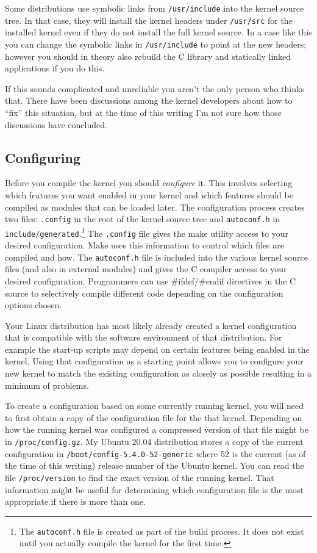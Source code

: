 \documentclass{article}
\newcommand{\filename}[1]{\texttt{#1}}
\newcommand{\newterm}[1]{\textit{#1}}
\begin{document}
Some distributions use symbolic links from \filename{/usr/include} into the kernel source tree.
In that case, they will install the kernel headers under \filename{/usr/src} for the installed
kernel even if they do not install the full kernel source. In a case like this you can change
the symbolic links in \filename{/usr/include} to point at the new headers; however you should in
theory also rebuild the C library and statically linked applications if you do this.

If this sounds complicated and unreliable you aren't the only person who thinks that. There have
been discussions among the kernel developers about how to ``fix'' this situation, but at the
time of this writing I'm not sure how those discussions have concluded.

\subsection{Configuring}
\label{sec:configuring}

Before you compile the kernel you should \newterm{configure} it. This involves selecting which
features you want enabled in your kernel and which features should be compiled as modules that
can be loaded later. The configuration process creates two files: \filename{.config} in the root
of the kernel source tree and \filename{autoconf.h} in
\filename{include/generated}.\footnote{The \filename{autoconf.h} file is created as part of the
  build process. It does not exist until you actually compile the kernel for the first time.}
The \filename{.config} file gives the make utility access to your desired configuration. Make
uses this information to control which files are compiled and how. The \filename{autoconf.h}
file is included into the various kernel source files (and also in external modules) and gives
the C compiler access to your desired configuration. Programmers can use \#ifdef/\#endif
directives in the C source to selectively compile different code depending on the configuration
options chosen.

Your Linux distribution has most likely already created a kernel configuration that is
compatible with the software environment of that distribution. For example the start-up scripts
may depend on certain features being enabled in the kernel. Using that configuration as a
starting point allows you to configure your new kernel to match the existing configuration as
closely as possible resulting in a minimum of problems.

To create a configuration based on some currently running kernel, you will need to first obtain
a copy of the configuration file for the that kernel. Depending on how the running kernel was
configured a compressed version of that file might be in \filename{/proc/config.gz}. My Ubuntu
20.04 distribution stores a copy of the current configuration in
\filename{/boot/config-5.4.0-52-generic} where 52 is the current (as of the time of this
writing) release number of the Ubuntu kernel. You can read the file \filename{/proc/version} to
find the exact version of the running kernel. That information might be useful for determining
which configuration file is the most appropriate if there is more than one.
\end{document}

